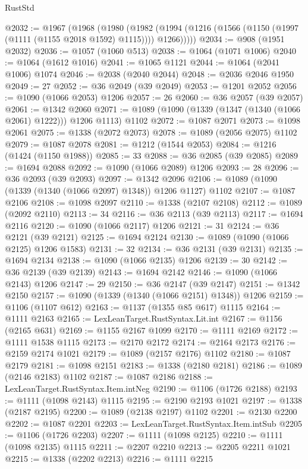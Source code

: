 \begin{lexlean}{RustStd}
\begin{coremodule}
@2032 := @1967
    (@1968
      (@1980
        (@1982 (@1994 (@1216 (@1566 (@1150 (@1997 (@1111 (@1155 @2018 @1592) @1115)))) @1266)))))
@2034 := @908 (@1951 @2032)
@2036 := @1057 (@1060 @513)
@2038 := @1064 (@1071 @1006)
@2040 := @1064 (@1612 @1016)
@2041 := @1065 @1121
@2044 := @1064 (@2041 @1006) @1074
@2046 := @2038 (@2040 @2044)
@2048 := @2036 @2046 @1950
@2049 := 27
@2052 := @36 @2049 (@39 @2049)
@2053 := @1201 @2052
@2056 := @1090 (@1066 @2053) @1206
@2057 := 26
@2060 := @36 @2057 (@39 @2057)
@2061 := @1342 @2060
@2071 := @1089 (@1090 (@1339 (@1347 (@1340 (@1066 @2061) @1222))) @1206 @1113) @1102
@2072 := @1087 @2071
@2073 := @1098 @2061
@2075 := @1338 (@2072 @2073)
@2078 := @1089 (@2056 @2075) @1102
@2079 := @1087 @2078
@2081 := @1212 (@1544 @2053)
@2084 := @1216 (@1424 (@1150 @1988))
@2085 := 33
@2088 := @36 @2085 (@39 @2085)
@2089 := @1694 @2088
@2092 := @1090 (@1066 @2089) @1206
@2093 := 28
@2096 := @36 @2093 (@39 @2093)
@2097 := @1342 @2096
@2106 := @1089 (@1090 (@1339 (@1340 (@1066 @2097) @1348)) @1206 @1127) @1102
@2107 := @1087 @2106
@2108 := @1098 @2097
@2110 := @1338 (@2107 @2108)
@2112 := @1089 (@2092 @2110)
@2113 := 34
@2116 := @36 @2113 (@39 @2113)
@2117 := @1694 @2116
@2120 := @1090 (@1066 @2117) @1206
@2121 := 31
@2124 := @36 @2121 (@39 @2121)
@2125 := @1694 @2124
@2130 := @1089 (@1090 (@1066 @2125) @1206 @1583)
@2131 := 32
@2134 := @36 @2131 (@39 @2131)
@2135 := @1694 @2134
@2138 := @1090 (@1066 @2135) @1206
@2139 := 30
@2142 := @36 @2139 (@39 @2139)
@2143 := @1694 @2142
@2146 := @1090 (@1066 @2143) @1206
@2147 := 29
@2150 := @36 @2147 (@39 @2147)
@2151 := @1342 @2150
@2157 := @1090 (@1339 (@1340 (@1066 @2151) @1348)) @1206
@2159 := @1106 (@1107 @612)
@2163 := @1137 (@1355 @85 @617) @1115
@2164 := @1111 @2163
@2165 := LexLeanTarget.RustSyntax.Lit.int
@2167 := @1156 (@2165 @631)
@2169 := @1155 @2167 @1099
@2170 := @1111 @2169
@2172 := @1111 @1538 @1115
@2173 := @2170 @2172
@2174 := @2164 @2173
@2176 := @2159 @2174 @1021
@2179 := @1089 (@2157 @2176) @1102
@2180 := @1087 @2179
@2181 := @1098 @2151
@2183 := @1338 (@2180 @2181)
@2186 := @1089 (@2146 @2183) @1102
@2187 := @1087 @2186
@2188 := LexLeanTarget.RustSyntax.Item.intNeg
@2190 := @1106 (@1726 @2188)
@2193 := @1111 (@1098 @2143) @1115
@2195 := @2190 @2193 @1021
@2197 := @1338 (@2187 @2195)
@2200 := @1089 (@2138 @2197) @1102
@2201 := @2130 @2200
@2202 := @1087 @2201
@2203 := LexLeanTarget.RustSyntax.Item.intSub
@2205 := @1106 (@1726 @2203)
@2207 := @1111 (@1098 @2125)
@2210 := @1111 (@1098 @2135) @1115
@2211 := @2207 @2210
@2213 := @2205 @2211 @1021
@2215 := @1338 (@2202 @2213)
@2216 := @1111 @2215

\end{coremodule}
\end{lexlean}
